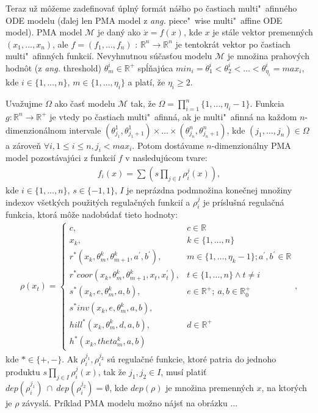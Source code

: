 \documentclass[11pt,final,oneside]{fithesis}
\begin{document}
Teraz u\v z m\^ o\v zeme zadefinova\v t \'upln\'y form\'at n\'a\v sho po \v castiach multi"~a\-fin\-n\'eho ODE modelu 
(\v dalej len PMA model z \textit{ang.} piece"~wise multi"~affine ODE model). PMA model $\mathcal{M}$ je dan\'y ako $\dot{x} = f(x)$, 
kde $x$ je st\'ale vektor premenn\'ych $(x_1,\dots{},x_n)$, ale $f = (f_1,\dots{},f_n)$ : $\mathbb{R}^n \rightarrow \mathbb{R}^n$ je tentokr\'at vektor 
po \v castiach multi"~afinn\'ych funkci\'i. Nevyhnutnou s\'u\v cas\v tou modelu $\mathcal{M}$ je mno\v zina prahov\'ych hodn\^ ot (z \textit{ang.} threshold)
$\theta_m^i \in \mathbb{R}^+$ sp\'l\v naj\'uca $min_i = \theta_1^i < \theta_2^i < \dots{} < \theta_{\eta_i}^i = max_i$, kde $i \in \{1,\dots{},n\}$, 
$m \in \{1,\dots{},\eta_i\}$ a plat\'i, \v ze $\eta_i \geq 2$.

Uva\v zujme $\Omega$ ako \v cas\v t modelu $\mathcal{M}$ tak, \v ze $\Omega = \prod_{i = 1}^n\{1,\dots{},\eta_i - 1\}$. Funkcia 
$g : \mathbb{R}^n \rightarrow \mathbb{R}^+$ je vtedy po \v castiach multi"~afinn\'a, ak je multi"~afinn\'a na ka\v zdom $n$-dimenzion\'alnom intervale
$(\theta_{j_1}^1,\theta_{j_1 + 1}^1)\times \dots{} \times (\theta_{j_n}^n,\theta_{j_n + 1}^n)$, kde $(j_1,\dots{},j_n) \in \Omega$ a z\'arove\v n 
$\forall{}i, 1 \leq i \leq n, j_i < max_i$. Potom dost\'avame $n$-dimenzion\'alny PMA model pozost\'avaj\'uci z funkci\'i $f$ v nasleduj\'ucom tvare:
\begin{align}
\label{eq:equationDescribtion}
f_i(x) = \sum (s\underset{j \in I}\prod{\rho_i^j(x)}),
\end{align}
kde $i \in \{1,\dots{},n\}$, $s \in \{-1,1\}$, $I$ je nepr\'azdna podmno\v zina kone\v cnej mno\v ziny indexov v\v setk\'ych pou\v zit\'ych regula\v cn\'ych
funkci\'i a $\rho_i^j$ je pr\'islu\v sn\'a regula\v cn\'a funkcia, ktor\'a m\^ o\v ze nadob\'uda\v t tieto hodnoty:
\begin{align}
\label{eq:regulatingFunctions}
\rho(x_t) = 
\left\{ \begin{array}{cl}
c, &c \in \mathbb{R}\\
x_k, & k \in \{1,\dots{},n\}\\
r^*(x_k,\theta_m^k,\theta_{m+1}^k,a^{'},b^{'}), &m \in \{1,\dots{},\eta_k-1\}; a^{'},b^{'} \in \mathbb{R}\\
r^*coor(x_k,\theta_m^k,\theta_{m+1}^k,x_t,x_t^{'}), &t \in \{1,\dots{},n\} \wedge t \neq i\\
s^*(x_k,e,\theta_m^k,a,b), &e \in \mathbb{R}^+; \ a,b \in \mathbb{R}_0^+\\
s^*inv(x_k,e,\theta_m^k,a,b),\\
hill^*(x_k,\theta_m^k,d,a,b), &d \in \mathbb{R}^+\\
h^*(x_k,theta_m^k,a,b)
\end{array} \right. ,
\end{align}
kde $* \in \{+,-\}$. Ak $\rho_i^{j_1}, \rho_i^{j_2}$ s\'u regula\v cn\'e funkcie, ktor\'e patria do jednoho produktu $s\underset{j \in I}\prod\rho_i^j(x)$,
tak \v ze $j_1, j_2 \in I$, mus\'i plati\v t $dep(\rho_i^{j_1})\ \cap\ dep(\rho_i^{j_2}) = \emptyset$, kde $dep(\rho)$ je mno\v zina premenn\'ych $x$,
na ktor\'ych je $\rho$ z\'avysl\'a.
Pr\'iklad PMA modelu mo\v zno n\'ajs\v t na obr\'azku ... 
\end{document}
